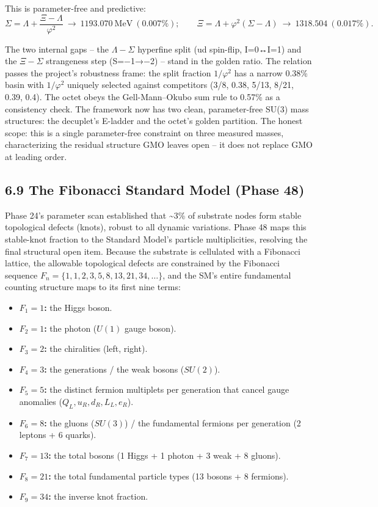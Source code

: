 \documentclass[
  11pt,
]{article}
\providecommand{\tightlist}{%
  \setlength{\itemsep}{0pt}\setlength{\parskip}{0pt}}
\begin{document}
This is parameter-free and predictive:
\[\Sigma = \Lambda + \frac{\Xi-\Lambda}{\varphi^2}\ \to\ 1193.070\ \text{MeV}\ (0.007\%); \qquad \Xi = \Lambda + \varphi^2(\Sigma-\Lambda)\ \to\ 1318.504\ (0.017\%).\]

The two internal gaps -- the \(\Lambda{-}\Sigma\) hyperfine split (ud
spin-flip, I=0↔I=1) and the \(\Xi{-}\Sigma\) strangeness step (S=−1→−2)
-- stand in the golden ratio. The relation passes the project's
robustness frame: the split fraction \(1/\varphi^2\) has a narrow 0.38\%
basin with \(1/\varphi^2\) uniquely selected against competitors (3/8,
0.38, 5/13, 8/21, 0.39, 0.4). The octet obeys the Gell-Mann--Okubo sum
rule to 0.57\% as a consistency check. The framework now has two clean,
parameter-free SU(3) mass structures: the decuplet's E-ladder and the
octet's golden partition. The honest scope: this is a single
parameter-free constraint on three measured masses, characterizing the
residual structure GMO leaves open -- it does not replace GMO at leading
order.

\subsection{6.9 The Fibonacci Standard Model (Phase
48)}\label{the-fibonacci-standard-model-phase-48}

Phase 24's parameter scan established that \textasciitilde3\% of
substrate nodes form stable topological defects (knots), robust to all
dynamic variations. Phase 48 maps this stable-knot fraction to the
Standard Model's particle multiplicities, resolving the final structural
open item. Because the substrate is cellulated with a Fibonacci lattice,
the allowable topological defects are constrained by the Fibonacci
sequence \(F_n = \{1, 1, 2, 3, 5, 8, 13, 21, 34, \ldots\}\), and the
SM's entire fundamental counting structure maps to its first nine terms:

\begin{itemize}
\tightlist
\item
  \textbf{\(F_1 = 1\):} the Higgs boson.
\item
  \textbf{\(F_2 = 1\):} the photon (\(U(1)\) gauge boson).
\item
  \textbf{\(F_3 = 2\):} the chiralities (left, right).
\item
  \textbf{\(F_4 = 3\):} the generations / the weak bosons (\(SU(2)\)).
\item
  \textbf{\(F_5 = 5\):} the distinct fermion multiplets per generation
  that cancel gauge anomalies (\(Q_L, u_R, d_R, L_L, e_R\)).
\item
  \textbf{\(F_6 = 8\):} the gluons (\(SU(3)\)) / the fundamental
  fermions per generation (2 leptons + 6 quarks).
\item
  \textbf{\(F_7 = 13\):} the total bosons (1 Higgs + 1 photon + 3 weak +
  8 gluons).
\item
  \textbf{\(F_8 = 21\):} the total fundamental particle types (13 bosons
  + 8 fermions).
\item
  \textbf{\(F_9 = 34\):} the inverse knot fraction.
\end{itemize}
\end{document}
